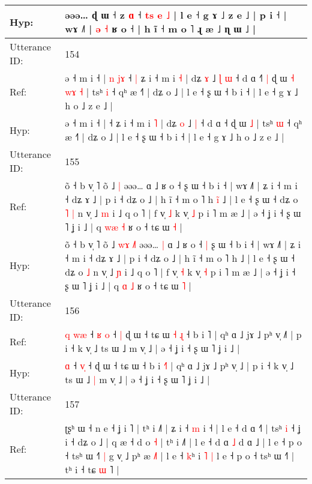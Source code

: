 \documentclass[10pt]{article}
\DeclareRobustCommand{\hl}[1]{{\textcolor{red}{#1}}}
\begin{document}
\begin{longtable}{ll}
 \\
Hyp: & əəə… ɖ ɯ ˧ z \hl{ɑ} ˧\hl{ }\hl{t}\hl{s}\hl{ }\hl{e}\hl{ }\hl{˩} | l e ˧ g ɤ ˩ z e ˩ | p i ˧ | wɤ ˩˥ | \hl{ə} \hl{˧} ʁ o ˧\hl{}\hl{}\hl{}\hl{}\hl{}\hl{}\hl{}\hl{}\hl{}\hl{} | h ĩ ˧ m o ˥ ɻ æ ˩ ɳ ɯ ˩ |
 \\
\midrule
Utterance ID: & 154 \\
Ref: & ə ˧ m i ˧ |\hl{ }\hl{n}\hl{ }\hl{j}\hl{ɤ} ˧\hl{ }\hl{|} ʑ i ˧ m i \hl{˧} | dʑ \hl{ɤ} ˩\hl{ }\hl{ɭ} \hl{ɯ} ˧ d ɑ ˧\hl{˥}\hl{ }\hl{|} ɖ ɯ\hl{ }\hl{˧}\hl{ }\hl{w}\hl{ɤ} \hl{˧} | tsʰ \hl{i} ˧ qʰ æ ˧˥ | dʑ o ˩ | l e ˧ ʂ ɯ ˧ b i ˧ | l e ˧ g ɤ ˩ h o ˩ z e ˩ |
 \\
Hyp: & ə ˧ m i ˧ |\hl{}\hl{}\hl{}\hl{}\hl{} ˧\hl{}\hl{} ʑ i ˧ m i \hl{˥} | dʑ \hl{o} ˩\hl{}\hl{} \hl{|} ˧ d ɑ ˧\hl{}\hl{}\hl{} ɖ ɯ\hl{}\hl{}\hl{}\hl{}\hl{} \hl{˩} | tsʰ \hl{ɯ} ˧ qʰ æ ˧˥ | dʑ o ˩ | l e ˧ ʂ ɯ ˧ b i ˧ | l e ˧ g ɤ ˩ h o ˩ z e ˩ |
 \\
\midrule
Utterance ID: & 155 \\
Ref: & õ ˧ b v̩ ˥ õ ˩\hl{}\hl{}\hl{} \hl{}\hl{|} əəə…\hl{}\hl{} ɑ ˩ ʁ o ˧\hl{}\hl{} ʂ ɯ ˧ b i ˧ | wɤ ˩˥ | ʑ i ˧ m i ˧ dʑ ɤ ˩ | p i ˧ dʑ o ˩ | h ĩ ˧ m o ˥ h\hl{ }\hl{i}\hl{̃} ˩ | l e ˧ ʂ ɯ ˧ dʑ o\hl{ }\hl{˥} \hl{|} n v̩ ˩ \hl{m} i ˩ q o ˥ | f v̩ \hl{˩} k v̩ \hl{˩} p i ˥ m æ ˩ | ə ˧ ʝ i ˧ ʂ ɯ ˥ ʝ i ˩ | q \hl{w}\hl{æ} \hl{˧} ʁ o ˧ tɕ ɯ \hl{˧} |
 \\
Hyp: & õ ˧ b v̩ ˥ õ ˩\hl{ }\hl{w}\hl{ɤ} \hl{˩}\hl{˥} əəə…\hl{ }\hl{|} ɑ ˩ ʁ o ˧\hl{ }\hl{|} ʂ ɯ ˧ b i ˧ | wɤ ˩˥ | ʑ i ˧ m i ˧ dʑ ɤ ˩ | p i ˧ dʑ o ˩ | h ĩ ˧ m o ˥ h\hl{}\hl{}\hl{} ˩ | l e ˧ ʂ ɯ ˧ dʑ o\hl{}\hl{} \hl{˩} n v̩ ˩ \hl{ɲ} i ˩ q o ˥ | f v̩ \hl{˧} k v̩ \hl{˧} p i ˥ m æ ˩ | ə ˧ ʝ i ˧ ʂ ɯ ˥ ʝ i ˩ | q \hl{}\hl{ɑ} \hl{˩} ʁ o ˧ tɕ ɯ \hl{˥} |
 \\
\midrule
Utterance ID: & 156 \\
Ref: & \hl{q}\hl{ }\hl{w}\hl{æ} ˧ \hl{ʁ}\hl{ }\hl{o} ˧\hl{ }\hl{|} ɖ ɯ ˧ tɕ ɯ\hl{ }\hl{˧}\hl{ }\hl{ɻ} ˧ b i \hl{}˥ | qʰ ɑ ˩ jɤ ˩ pʰ v̩ ˩\hl{˥} | p i ˧ k v̩ ˩ ts ɯ ˩\hl{}\hl{} m v̩ ˩ | ə ˧ ʝ i ˧ ʂ ɯ ˥ ʝ i ˩ |
 \\
Hyp: & \hl{}\hl{}\hl{}\hl{ɑ} ˧ \hl{}\hl{v}\hl{̩} ˧\hl{}\hl{} ɖ ɯ ˧ tɕ ɯ\hl{}\hl{}\hl{}\hl{} ˧ b i \hl{˧}˥ | qʰ ɑ ˩ jɤ ˩ pʰ v̩ ˩\hl{} | p i ˧ k v̩ ˩ ts ɯ ˩\hl{ }\hl{|} m v̩ ˩ | ə ˧ ʝ i ˧ ʂ ɯ ˥ ʝ i ˩ |
 \\
\midrule
Utterance ID: & 157 \\
Ref: & ʈʂʰ ɯ ˧ n e ˧ ʝ i ˥ | tʰ i ˩˥\hl{}\hl{}\hl{}\hl{} | ʑ i ˧ \hl{m} i ˧ | l e ˧ d ɑ ˧˥ | tsʰ \hl{i} ˧ ʝ i ˧ dʑ o ˩ | q æ ˧ d o \hl{˧} | tʰ i ˩˥ | l e ˧ d ɑ \hl{˩} d ɑ ˩ | l e ˧ p o ˧ tsʰ ɯ ˧˥\hl{ }\hl{|} g v̩ ˩\hl{}\hl{}\hl{} pʰ æ \hl{˩}˥ | l e ˧ \hl{}\hl{k}ʰ i \hl{˥}\hl{ }\hl{|} l e ˧ p o ˧ tsʰ ɯ ˧˥ | tʰ i ˧ tɕ \hl{ɯ} ˥ |

\end{longtable}
\end{document}

